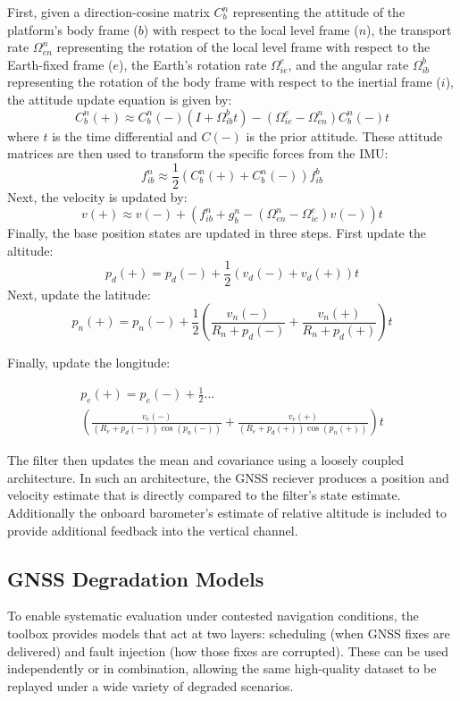 \documentclass[Afour,sageh,times]{sagej}
\begin{document}
First, given a direction-cosine matrix \(C_b^n\) representing the attitude of the platform's body frame (\(b\)) with respect to the local level frame (\(n\)), the transport rate \(\Omega_{en}^n\) representing the rotation of the local level frame with respect to the Earth-fixed frame (\(e\)), the Earth's rotation rate \(\Omega_{ie}^e\), and the angular rate \(\Omega_{ib}^b\) representing the rotation of the body frame with respect to the inertial frame (\(i\)), the attitude update equation is given by:
\[
C_b^n(+) \approx C_b^n(-) \left( I + \Omega_{ib}^b t \right) - \left( \Omega_{ie}^e - \Omega_{en}^n \right) C_b^n(-) t
\]
where \(t\) is the time differential and \(C(-)\) is the prior attitude. These attitude matrices are then used to transform the
specific forces from the IMU:
\[
f_{ib}^n \approx \frac{1}{2} \left( C_b^n(+) + C_b^n(-) \right) f_{ib}^b
\]
Next, the velocity is updated by:
\[
v(+) \approx v(-) + \left( f_{ib}^n + g_{b}^n - \left( \Omega_{en}^n - \Omega_{ie}^e \right) v(-) \right) t
\]
Finally, the base position states are updated in three steps. First update the altitude:
\[
p_d(+) = p_d(-) + \frac{1}{2} \left( v_d(-) + v_d(+) \right) t
\]
Next, update the latitude:
\[
p_n(+) = p_n(-) + \frac{1}{2} \left( \frac{v_n(-)}{R_n + p_d(-)} + \frac{v_n(+)}{R_n + p_d(+) } \right) t
\]

Finally, update the longitude:

\begin{equation*}
    \begin{split}
      p_e(+) = p_e(-) + \frac{1}{2} \dots \\ \left( \frac{v_e(-)}{(R_e + p_d(-)) \cos(p_n(-))} + \frac{v_e(+)}{(R_e + p_d(+)) \cos(p_n(+))} \right) t
    \end{split}
\end{equation*}

The filter then updates the mean and covariance using a loosely coupled architecture. In such an architecture, the GNSS reciever produces a position and velocity estimate that is directly compared to the filter's state estimate. Additionally the onboard barometer's estimate of relative altitude is included to provide additional feedback into the vertical channel.

\subsection{GNSS Degradation Models}

To enable systematic evaluation under contested navigation conditions, the toolbox provides models that act at two layers: scheduling (when GNSS fixes are delivered) and fault injection (how those fixes are corrupted). These can be used independently or in combination, allowing the same high-quality dataset to be replayed under a wide variety of degraded scenarios.  
\end{document}
